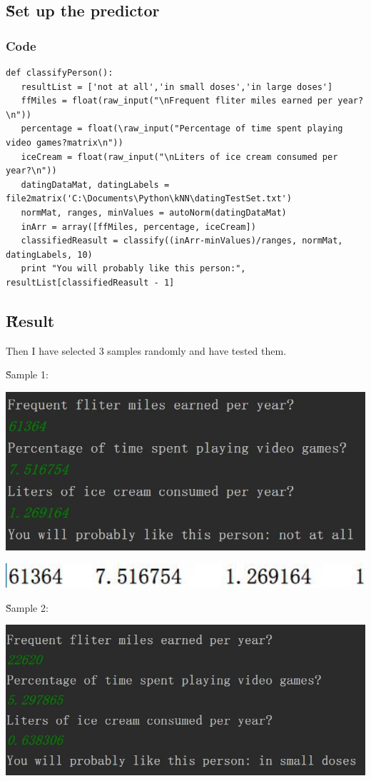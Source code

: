 \documentclass[12pt]{article}
\begin{document}
\subsection{\H Set up the predictor}
\subsubsection{Code}
\begin{lstlisting}
def classifyPerson():
   resultList = ['not at all','in small doses','in large doses']
   ffMiles = float(raw_input("\nFrequent fliter miles earned per year?\n"))
   percentage = float(\raw_input("Percentage of time spent playing video games?matrix\n"))
   iceCream = float(raw_input("\nLiters of ice cream consumed per year?\n"))
   datingDataMat, datingLabels = file2matrix('C:\Documents\Python\kNN\datingTestSet.txt')
   normMat, ranges, minValues = autoNorm(datingDataMat)
   inArr = array([ffMiles, percentage, iceCream])
   classifiedReasult = classify((inArr-minValues)/ranges, normMat, datingLabels, 10)
   print "You will probably like this person:", resultList[classifiedReasult - 1]

\end{lstlisting}

\subsection{\H Result}
Then I have selected 3 samples randomly and have tested them.

\H{Sample 1:}

\includegraphics[width=5.5in]{3.jpg}

\includegraphics[width=5.5in]{2.jpg}

\H{Sample 2:}

\includegraphics[width=5.5in]{5.jpg}
\end{document}

